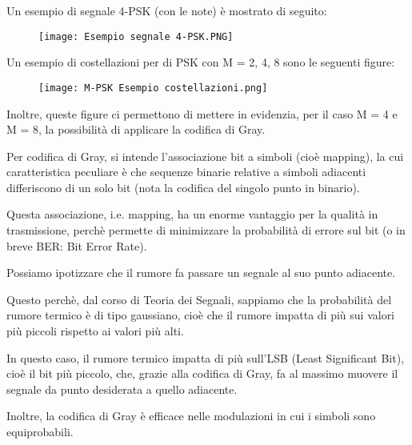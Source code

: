 Un esempio di segnale 4-PSK (con le note) è mostrato di seguito: 

\begin{figure}[h]
    \centering
    \texttt{[image: Esempio segnale 4-PSK.PNG]}
\end{figure}

\newpage 

Un esempio di costellazioni per di PSK con M = 2, 4, 8 sono le seguenti figure: 

\begin{figure}[h]
    \centering
    \texttt{[image: M-PSK Esempio costellazioni.png]}
\end{figure}

Inoltre, queste figure ci permettono di mettere in evidenzia, 
per il caso M = 4 e M = 8, 
la possibilità di applicare la codifica di Gray. \newline 

Per codifica di Gray, si intende l'associazione bit a simboli (cioè mapping), 
la cui caratteristica peculiare è che sequenze binarie relative a simboli adiacenti differiscono di un solo bit 
(nota la codifica del singolo punto in binario). \newline 

Questa associazione, i.e. mapping, ha un enorme vantaggio per la qualità in trasmissione, 
perchè permette di minimizzare la probabilità di errore sul bit (o in breve BER: Bit Error Rate). \newline 

\begin{tcolorbox}
Possiamo ipotizzare che il rumore fa passare un segnale al suo punto adiacente. \newline 

Questo perchè, dal corso di Teoria dei Segnali, sappiamo che la probabilità del rumore termico è di tipo gaussiano, 
cioè che il rumore impatta di più sui valori più piccoli rispetto ai valori più alti. \newline 

In questo caso, il rumore termico impatta di più sull'LSB (Least Significant Bit), cioè il bit più piccolo, 
che, grazie alla codifica di Gray, fa al massimo muovere il segnale da punto desiderata a quello adiacente. \newline 

Inoltre, la codifica di Gray è efficace nelle modulazioni in cui i simboli sono equiprobabili. 
\end{tcolorbox}

